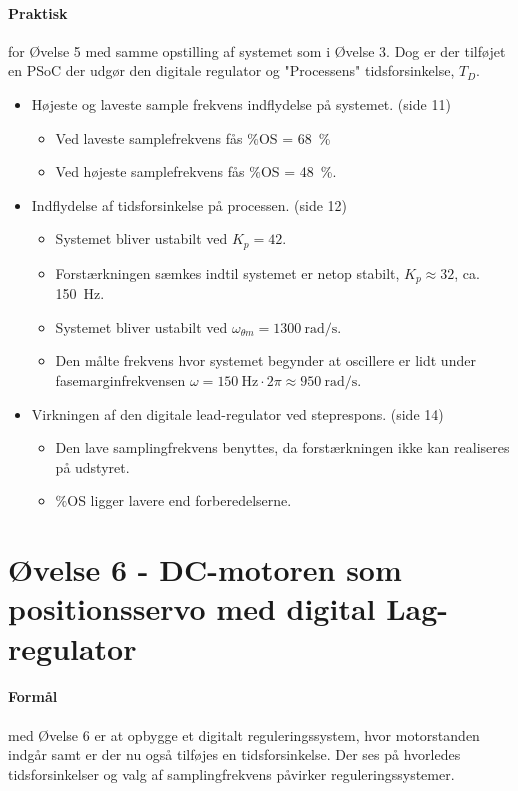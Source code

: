 \documentclass[danish]{article}
\begin{document}
\paragraph{Praktisk} for Øvelse 5 med samme opstilling af systemet som i Øvelse 3. Dog er der tilføjet en PSoC der udgør den digitale regulator og "Processens" tidsforsinkelse, $T_D$.
\begin{itemize}
	\item Højeste og laveste sample frekvens indflydelse på systemet. (side 11)
	\begin{itemize}
		\item  Ved laveste samplefrekvens fås $\si{\percent}$OS = \SI{68}{\percent} 
		\item Ved højeste samplefrekvens fås $\si{\percent}$OS = \SI{48}{\percent}.
	\end{itemize}
	\item Indflydelse af tidsforsinkelse på processen. (side 12)
	\begin{itemize}
		\item Systemet bliver ustabilt ved $K_p = 42$.
		\item Forstærkningen sæmkes indtil systemet er netop stabilt, $K_p \approx 32$, ca. \SI{150}{\hertz}.
		\item Systemet bliver ustabilt ved 
		$\omega_{\theta m} = \SI{1300}{\radian\per\second}$.
		\item Den målte frekvens hvor systemet begynder at oscillere er lidt under fasemarginfrekvensen $\omega = \SI{150}{\hertz}\cdot 2\pi \approx \SI{950}{\radian\per\second}$.
	\end{itemize}
	\item Virkningen af den digitale lead-regulator ved steprespons. (side 14)
	\begin{itemize}
		\item Den lave samplingfrekvens benyttes, da forstærkningen ikke kan realiseres på udstyret.
		\item $\si{\percent}$OS ligger lavere end forberedelserne.
	\end{itemize}
\end{itemize}

\newpage
\section{Øvelse 6 - DC-motoren som positionsservo med digital Lag- regulator}
\paragraph{Formål} med Øvelse 6 er at opbygge et digitalt reguleringssystem, hvor motorstanden indgår samt er der nu også tilføjes en tidsforsinkelse. Der ses på hvorledes tidsforsinkelser og valg af samplingfrekvens påvirker reguleringssystemer.
\end{document}
